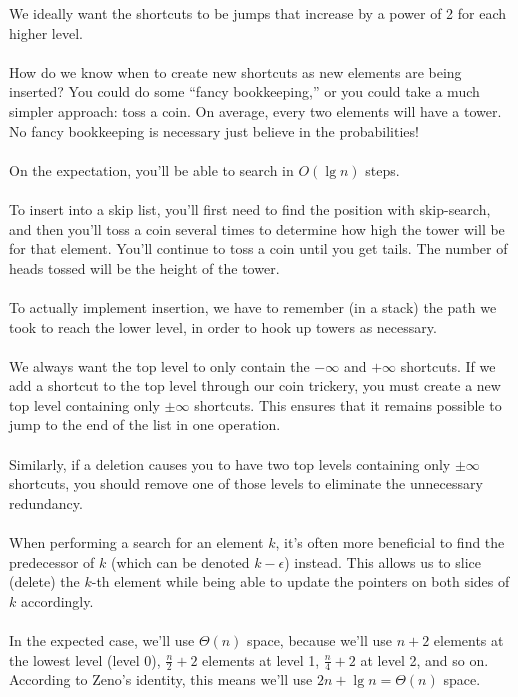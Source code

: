 \documentclass[]{article}
\theoremstyle{definition}
\begin{document}
			We ideally want the shortcuts to be jumps that increase by a power of 2 for each higher level.
			\\ \\
			How do we know when to create new shortcuts as new elements are being inserted? You could do some ``fancy bookkeeping,'' or you could take a much simpler approach: toss a coin. On average, every two elements will have a tower. No fancy bookkeeping is necessary \textendash{} just believe in the probabilities!
			\\ \\
			On the expectation, you'll be able to search in $O(\lg n)$ steps.
			\\ \\
			To insert into a skip list, you'll first need to find the position with skip-search, and then you'll toss a coin several times to determine how high the tower will be for that element. You'll continue to toss a coin until you get tails. The number of heads tossed will be the height of the tower.
			\\ \\
			To actually implement insertion, we have to remember (in a stack) the path we took to reach the lower level, in order to hook up towers as necessary.
			\\ \\
			We always want the top level to only contain the $- \infty$ and $+ \infty$ shortcuts. If we add a shortcut to the top level through our coin trickery, you must create a new top level containing only $\pm \infty$ shortcuts. This ensures that it remains possible to jump to the end of the list in one operation.
			\\ \\
			Similarly, if a deletion causes you to have two top levels containing only $\pm \infty$ shortcuts, you should remove one of those levels to eliminate the unnecessary redundancy.
			\\ \\
			When performing a search for an element $k$, it's often more beneficial to find the predecessor of $k$ (which can be denoted $k - \epsilon$) instead. This allows us to slice (delete) the $k$-th element while being able to update the pointers on both sides of $k$ accordingly.
			\\ \\
			In the expected case, we'll use $\Theta(n)$ space, because we'll use $n + 2$ elements at the lowest level (level 0), $\frac{n}{2} + 2$ elements at level 1, $\frac{n}{4} + 2$ at level 2, and so on. According to Zeno's identity, this means we'll use $2n + \lg n = \Theta(n)$ space.
\end{document}
